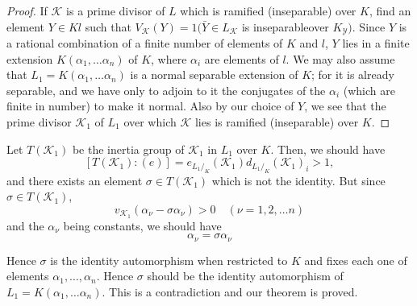 \begin{proof}
  If $\mathscr{K}$ is a prime divisor of $L$ which is ramified
  (inseparable) over $K$, find an element $Y \in Kl$ such that $V_
  \mathscr{K}(Y)=1(\bar{Y} \in L_{\mathscr{K}}$ is inseparable\pageoriginale over
  $K_\mathscr{Y})$. Since $Y$ is a rational combination of a finite
  number of elements of $K$ and $l$, $Y$ lies in a finite extension
  $K(\alpha_1, \ldots \alpha_n)$ of $K$, where $\alpha_i$ are elements
  of $l$. We may also assume that $L_1 = K (\alpha_1, \ldots
  \alpha_n)$ is a normal separable extension of $K$; for it is already
  separable, and we have only to adjoin to it the conjugates of the
  $\alpha_i$ (which are finite in number) to make it normal. Also by
  our choice of $Y$, we see that the prime divisor $\mathscr{K}_1$ of
  $L_1$ over which $\mathscr{K}$ lies is ramified (inseparable) over
  $K$. 
\end{proof}

Let $T(\mathscr{K}_1)$ be the inertia group of $\mathscr{K}_1$ in
$L_1$ over $K$. Then, we should have 
$$
[ T(\mathscr{K}_1 ) : (e) ] = e_{L_1/_K} (\mathscr{K}_1) d_{L_1 /_K}
(\mathscr{K}_1)_i > 1, 
$$
and  there exists an element $\sigma \in T (\mathscr{K}_1)$ which is
not the identity. But since $\sigma \in T (\mathscr{K}_1)$, 
$$
v_{\mathscr{K}_1} (\alpha_\nu - \sigma \alpha_\nu) > 0 \quad (\nu = 1,
2, \ldots n) 
$$
and the $\alpha_\nu$ being constants, we should have
$$
\alpha_\nu = \sigma \alpha_\nu
$$

Hence $\sigma$ is the identity automorphism when restricted to $K$ and
fixes each one of elements  $\alpha_1, \ldots, \alpha_n$. Hence
$\sigma$ should 
be the identity automorphism of $L_1 = K (\alpha_1, \ldots
\alpha_n)$. This is a contradiction and our theorem is proved. 
